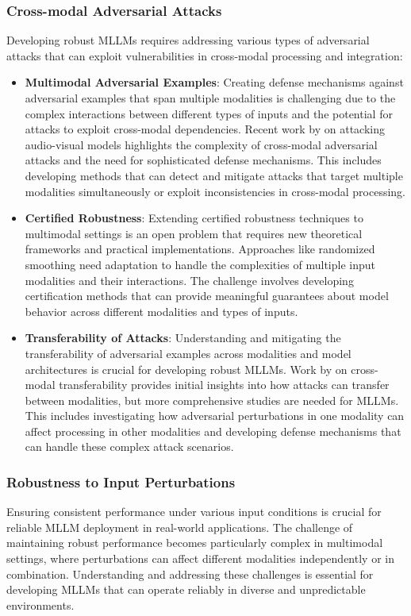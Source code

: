 \subsubsection{Cross-modal Adversarial Attacks}
Developing robust MLLMs requires addressing various types of adversarial attacks that can exploit vulnerabilities in cross-modal processing and integration:

\begin{itemize}
    \item \textbf{Multimodal Adversarial Examples}: Creating defense mechanisms against adversarial examples that span multiple modalities is challenging due to the complex interactions between different types of inputs and the potential for attacks to exploit cross-modal dependencies. Recent work by \citet{xu2018fooling} on attacking audio-visual models highlights the complexity of cross-modal adversarial attacks and the need for sophisticated defense mechanisms. This includes developing methods that can detect and mitigate attacks that target multiple modalities simultaneously or exploit inconsistencies in cross-modal processing.
    
    \item \textbf{Certified Robustness}: Extending certified robustness techniques to multimodal settings is an open problem that requires new theoretical frameworks and practical implementations. Approaches like randomized smoothing \citep{cohen2019certified} need adaptation to handle the complexities of multiple input modalities and their interactions. The challenge involves developing certification methods that can provide meaningful guarantees about model behavior across different modalities and types of inputs.
    
    \item \textbf{Transferability of Attacks}: Understanding and mitigating the transferability of adversarial examples across modalities and model architectures is crucial for developing robust MLLMs. Work by \citet{naseer2019cross} on cross-modal transferability provides initial insights into how attacks can transfer between modalities, but more comprehensive studies are needed for MLLMs. This includes investigating how adversarial perturbations in one modality can affect processing in other modalities and developing defense mechanisms that can handle these complex attack scenarios.
\end{itemize}

\subsubsection{Robustness to Input Perturbations}
Ensuring consistent performance under various input conditions is crucial for reliable MLLM deployment in real-world applications. The challenge of maintaining robust performance becomes particularly complex in multimodal settings, where perturbations can affect different modalities independently or in combination. Understanding and addressing these challenges is essential for developing MLLMs that can operate reliably in diverse and unpredictable environments.

